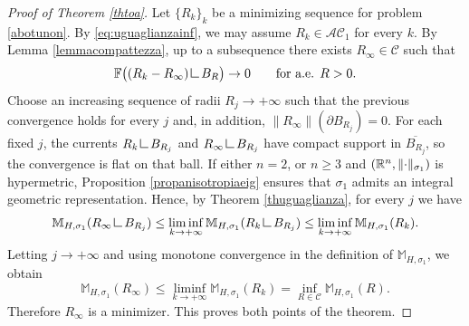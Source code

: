 \documentclass{article}
\numberwithin{equation}{section}
\theoremstyle{plain}%
\theoremstyle{definition}
\theoremstyle{definition}
\newcommand{\rgrande}{\mathbb{R}}
\newcommand{\massaanisotropauno}{\mathbb{M}_{H,\sigma_1}}
\newcommand{\mrestr}{\mathop{\hbox{\vrule height 7pt width 0.5pt depth 0pt
\vrule height 0.5pt width 6pt depth 0pt}}\nolimits}
\DeclarePairedDelimiter{\norma}{\lVert}{\rVert} %
\begin{document}
\begin{proof}[Proof of Theorem \ref{thtoa}]
Let $\{R_k\}_k$ be a minimizing sequence for problem \eqref{abotunon}. By \eqref{eq:uguaglianzainf}, we may assume $R_k\in\mathcal{AC}_1$ for every $k$. By Lemma \ref{lemmacompattezza}, up to a subsequence there exists $R_\infty\in\mathcal C$ such that
$$
\mathbb F\bigl((R_k-R_\infty)\mrestr B_R\bigr)\to 0
\qquad\text{for a.e. }R>0.
$$
Choose an increasing sequence of radii $R_j\to +\infty$ such that the previous convergence holds for every $j$ and, in addition, $\|R_\infty\|(\partial B_{R_j})=0$. For each fixed $j$, the currents $R_k\mrestr B_{R_j}$ and $R_\infty\mrestr B_{R_j}$ have compact support in $\overline{B_{R_j}}$, so the convergence is flat on that ball. If either $n=2$, or $n\ge 3$ and $(\rgrande^n,\norma{\cdot}_{\sigma_1})$ is hypermetric, Proposition \ref{propanisotropiaeig} ensures that $\sigma_1$ admits an integral geometric representation. Hence, by Theorem \ref{thuguaglianza}, for every $j$ we have
$$
\massaanisotropauno(R_\infty\mrestr B_{R_j})
\le
\liminf_{k\to+\infty}\massaanisotropauno(R_k\mrestr B_{R_j})
\le
\liminf_{k\to+\infty}\massaanisotropauno(R_k).
$$
Letting $j\to+\infty$ and using monotone convergence in the definition of $\massaanisotropauno$, we obtain
$$
\massaanisotropauno(R_\infty)
\le
\liminf_{k\to+\infty}\massaanisotropauno(R_k)
=
\inf_{R\in\mathcal C}\massaanisotropauno(R).
$$
Therefore $R_\infty$ is a minimizer. This proves both points of the theorem.
\end{proof}
\end{document}
